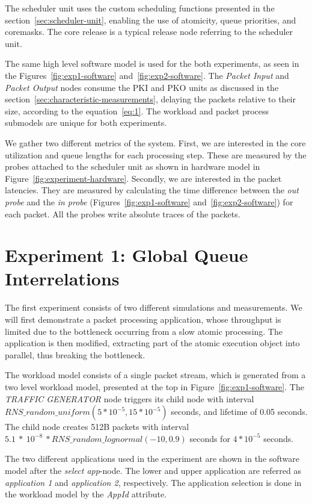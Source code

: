 The scheduler unit uses the custom scheduling functions presented in the section~\ref{sec:scheduler-unit}, enabling the use of atomicity, queue priorities, and coremasks. The core release is a typical release node referring to the scheduler unit.

The same high level software model is used for the both experiments, as seen in the Figures~\ref{fig:exp1-software} and~\ref{fig:exp2-software}. The \emph{Packet Input} and \emph{Packet Output} nodes consume the PKI and PKO units as discussed in the section~\ref{sec:characteristic-measurements}, delaying the packets relative to their size, according to the equation~\ref{eq:1}. The workload and packet process submodels are unique for both experiments.

We gather two different metrics of the system. First, we are interested in the core utilization and queue lengths for each processing step. These are measured by the probes attached to the scheduler unit as shown in hardware model in Figure~\ref{fig:experiment-hardware}. Secondly, we are interested in the packet latencies. They are measured by calculating the time difference between the \emph{out probe} and the \emph{in probe} (Figures~\ref{fig:exp1-software} and~\ref{fig:exp2-software}) for each packet. All the probes write absolute traces of the packets.

\section{Experiment 1: Global Queue Interrelations}
The first experiment consists of two different simulations and measurements. We will first demonstrate a packet processing application, whose throughput is limited due to the bottleneck occurring from a slow atomic processing. The application is then modified, extracting part of the atomic execution object into parallel, thus breaking the bottleneck.

The workload model consists of a single packet stream, which is generated from a two level workload model, presented at the top in Figure~\ref{fig:exp1-software}. The \emph{TRAFFIC GENERATOR} node triggers its child node with interval $RNS\_random\_uniform(5*10^{-5}, 15*10^{-5})$ seconds, and lifetime of 0.05 seconds. The child node creates 512B packets with interval $5.1~*~10^{-8}~* RNS\_random\_lognormal(-10, 0.9)$ seconds for $4*10^{-5}$ seconds.

The two different applications used in the experiment are shown in the software model after the \emph{select app}-node. The lower and upper application are referred as \emph{application 1} and \emph{application 2}, respectively. The application selection is done in the workload model by the \emph{AppId} attribute.

